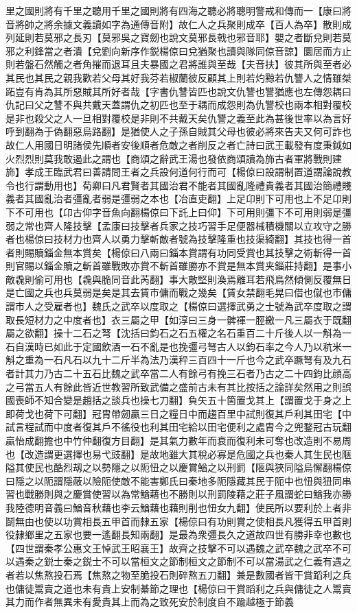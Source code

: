 里之國則將有千里之聽用千里之國則將有四海之聽必將聰明警戒和傳而一【康曰將音將帥之將余據文義讀如字為通傳音附】故仁人之兵聚則成卒【百人為卒】散則成列延則若莫邪之長刃【莫邪吳之寶劒也說文莫邪長戟也邪音耶】嬰之者斷兌則若莫邪之利鋒當之者潰【兌劉向新序作鋭楊倞曰兌猶聚也讀與隊同倞音諒】圜居而方止則若盤石然觸之者角摧而退耳且夫暴國之君將誰與至哉【夫音扶】彼其所與至者必其民也其民之親我歡若父母其好我芬若椒蘭彼反顧其上則若灼黥若仇讐人之情雖桀跖豈有肯為其所惡賊其所好者哉【字書仇讐皆匹也說文仇讐也讐猶應也左傳怨耦曰仇記曰父之讐不與共戴天蓋謂仇之初匹也至于耦而成怨則為仇讐校也兩本相對覆校是非也殺父之人一旦相對覆校是非則不共戴天矣仇讐之義至此為甚後世率以為言好呼到翻為于偽翻惡烏路翻】是猶使人之子孫自賊其父母也彼必將來告夫又何可詐也故仁人用國日明諸侯先順者安後順者危敵之者削反之者亡詩曰武王載發有度秉鉞如火烈烈則莫我敢遏此之謂也【商頌之辭武王湯也發依商頌讀為斾古者軍將戰則建斾】孝成王臨武君曰善請問王者之兵設何道何行而可【楊倞曰設謂制置道謂論說教令也行謂動用也】荀卿曰凡君賢者其國治君不能者其國亂隆禮貴義者其國治簡禮賤義者其國亂治者彊亂者弱是彊弱之本也【冶直吏翻】上足卬則下可用也上不足卬則下不可用也【卬古仰字音魚向翻楊倞曰下託上曰仰】下可用則彊下不可用則弱是彊弱之常也齊人隆技擊【孟康曰技擊者兵家之技巧習手足便器械積機關以立攻守之勝者也楊倞曰技材力也齊人以勇力擊斬敵者號為技擊隆重也技渠綺翻】其技也得一首者則賜贖錙金無本賞矣【楊倞曰八兩曰錙本賞謂有功同受賞也其技擊之術斬得一首則官賜以錙金贖之斬首雖戰敗亦賞不斬首雖勝亦不賞是無本賞夹錙莊持翻】是事小敵毳則偷可用也【毳與脆同音此芮翻】事大敵堅則渙焉離耳若飛鳥然傾側反覆無日是亡國之兵也兵莫弱是矣是其去賃市傭而戰之幾矣【賃女禁翻毛晃曰借也僦也市傭謂市人之受雇者也】魏氏之武卒以度取之【楊倞曰選擇武勇之士號為武卒度取之謂取長短材力之中度者也】衣三屬之甲【如淳曰三身一髀禈一脛繳一凡三屬衣于既翻屬之欲翻】操十二石之弩【沈括曰鈞石之石五權之名石重百二十斤後人以一斛為一石自漢時已如此于定國飲酒一石不亂是也挽彊弓弩古人以鈞石率之今人乃以秔米一斛之重為一石凡石以九十二斤半為法乃漢秤三百四十一斤也今之武卒蹶弩有及九石者計其力乃古二十五石比魏之武卒當二人有餘弓有挽三石者乃古之二十四鈞比顔高之弓當五人有餘此皆近世教習所致武備之盛前古未有其比按括之論詳矣然用之則誤國喪師不知合變是趙括之談兵也操七刀翻】負矢五十箇置戈其上【謂置戈于身之上即荷戈也荷下可翻】冠胄帶劒贏三日之糧日中而趨百里中試則復其戶利其田宅【中試言程試而中度者復其戶不徭役也利其田宅給以田宅便利之處胄今之兜鍪冠古玩翻贏怡成翻擔也中竹仲翻復方目翻】是其氣力數年而衰而復利未可奪也改造則不易周也【改造謂更選擇也易弋豉翻】是故地雖大其稅必寡是危國之兵也秦人其生民也陿隘其使民也酷烈刼之以勢隱之以阨忸之以慶賞鰌之以刑罰【陿與狹同隘烏懈翻楊倞曰隱之以阨謂隱蔽以險阨使敵不能害鄭氏曰秦地多阨隱藏其民于阨中也忸與狃同串習也戰勝則與之慶賞使習以為常鰌藉也不勝則以刑罰陵藉之莊子風謂蛇曰鰌我亦勝我陸德明音義曰鰌音秋藉也李云鰌藉也藉則削也忸女九翻】使民所以要利於上者非鬬無由也使以功賞相長五甲首而隸五家【楊倞曰有功則賞之使相長凡獲得五甲首則役隷鄉里之五家也要一遙翻長知兩翻】是最為衆彊長久之道故四世有勝非幸也數也【四世謂秦孝公惠文王悼武王昭襄王】故齊之技擊不可以遇魏之武卒魏之武卒不可以遇秦之鋭士秦之鋭士不可以當桓文之節制桓文之節制不可以當湯武之仁義有遇之者若以焦熬投石焉【焦熬之物至脆投石則碎熬五刀翻】兼是數國者皆干賞蹈利之兵也傭徒鬻賣之道也未有貴上安制綦節之理也【楊倞曰干賞蹈利之兵與傭徒之人鬻賣其力而作者無異未有愛貴其上而為之致死安於制度自不踰越極于節義